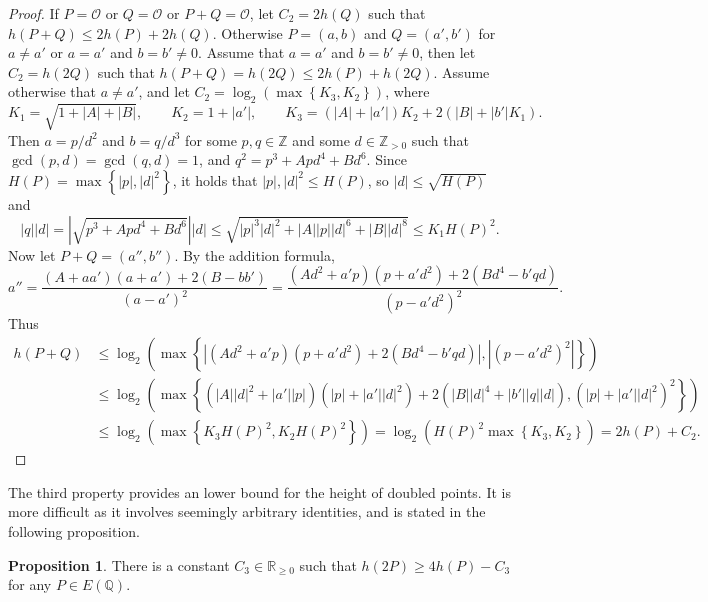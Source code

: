 \documentclass{article}
\newcommand{\Z}{\mathbb{Z}}
\newcommand{\Q}{\mathbb{Q}}
\newcommand{\R}{\mathbb{R}}
\newcommand{\rb}[1]{\left( #1 \right)}
\newcommand{\cb}[1]{\left\{ #1 \right\}}
\newcommand{\abs}[1]{\left\lvert #1 \right\rvert}
\theoremstyle{definition}\newtheorem*{definition}{Definition}
\theoremstyle{definition}\newtheorem*{example}{Example}
\theoremstyle{definition}\newtheorem*{remark}{Remark}
\newtheorem{proposition}{Proposition}[subsection]
\begin{document}
\begin{proof}
If $ P = \mathcal{O} $ or $ Q = \mathcal{O} $ or $ P + Q = \mathcal{O} $, let $ C_2 = 2h\rb{Q} $ such that $ h\rb{P + Q} \le 2h\rb{P} + 2h\rb{Q} $. Otherwise $ P = \rb{a, b} $ and $ Q = \rb{a', b'} $ for $ a \ne a' $ or $ a = a' $ and $ b = b' \ne 0 $. Assume that $ a = a' $ and $ b = b' \ne 0 $, then let $ C_2 = h\rb{2Q} $ such that $ h\rb{P + Q} = h\rb{2Q} \le 2h\rb{P} + h\rb{2Q} $. Assume otherwise that $ a \ne a' $, and let $ C_2 = \log_2\rb{\max\cb{K_3, K_2}} $, where
$$ K_1 = \sqrt{1 + \abs{A} + \abs{B}}, \qquad K_2 = 1 + \abs{a'}, \qquad K_3 = \rb{\abs{A} + \abs{a'}}K_2 + 2\rb{\abs{B} + \abs{b'}K_1}. $$
Then $ a = p / d^2 $ and $ b = q / d^3 $ for some $ p, q \in \Z $ and some $ d \in \Z_{> 0} $ such that $ \gcd\rb{p, d} = \gcd\rb{q, d} = 1 $, and $ q^2 = p^3 + Apd^4 + Bd^6 $. Since $ H\rb{P} = \max\cb{\abs{p}, \abs{d}^2} $, it holds that $ \abs{p}, \abs{d}^2 \le H\rb{P} $, so $ \abs{d} \le \sqrt{H\rb{P}} $ and
$$ \abs{q}\abs{d} = \abs{\sqrt{p^3 + Apd^4 + Bd^6}}\abs{d} \le \sqrt{\abs{p}^3\abs{d}^2 + \abs{A}\abs{p}\abs{d}^6 + \abs{B}\abs{d}^8} \le K_1H\rb{P}^2. $$
Now let $ P + Q = \rb{a'', b''} $. By the addition formula,
$$ a'' = \dfrac{\rb{A + aa'}\rb{a + a'} + 2\rb{B - bb'}}{\rb{a - a'}^2} = \dfrac{\rb{Ad^2 + a'p}\rb{p + a'd^2} + 2\rb{Bd^4 - b'qd}}{\rb{p - a'd^2}^2}. $$
Thus
\begin{align*}
h\rb{P + Q}
& \le \log_2\rb{\max\cb{\abs{\rb{Ad^2 + a'p}\rb{p + a'd^2} + 2\rb{Bd^4 - b'qd}}, \abs{\rb{p - a'd^2}^2}}} \\
& \le \log_2\rb{\max\cb{\rb{\abs{A}\abs{d}^2 + \abs{a'}\abs{p}}\rb{\abs{p} + \abs{a'}\abs{d}^2} + 2\rb{\abs{B}\abs{d}^4 + \abs{b'}\abs{q}\abs{d}}, \rb{\abs{p} + \abs{a'}\abs{d}^2}^2}} \\
& \le \log_2\rb{\max\cb{K_3H\rb{P}^2, K_2H\rb{P}^2}}
= \log_2\rb{H\rb{P}^2\max\cb{K_3, K_2}}
= 2h\rb{P} + C_2.
\end{align*}
\end{proof}

\pagebreak

The third property provides an lower bound for the height of doubled points. It is more difficult as it involves seemingly arbitrary identities, and is stated in the following proposition.

\begin{proposition}
\label{prop:lowerbound}
There is a constant $ C_3 \in \R_{\ge 0} $ such that $ h\rb{2P} \ge 4h\rb{P} - C_3 $ for any $ P \in E\rb{\Q} $.
\end{proposition}
\end{document}
